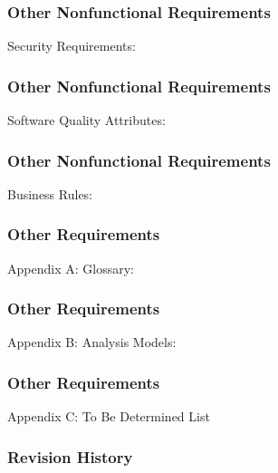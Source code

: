 \documentclass[utf8x]{beamer}
\begin{document}
\begin{frame}[t]
\frametitle{\LARGE Other Nonfunctional Requirements} %
\Large Security Requirements:
\end{frame}

\begin{frame}[t]
\frametitle{\LARGE Other Nonfunctional Requirements} %
\Large Software Quality Attributes:
\end{frame}

\begin{frame}[t]
\frametitle{\LARGE Other Nonfunctional Requirements} %
\Large Business Rules:
\end{frame}
\begin{frame}[t]
\frametitle{\huge Other Requirements} %
\Large Appendix A: Glossary:
\end{frame}

\begin{frame}[t]
\frametitle{\huge Other Requirements} %
\Large Appendix B: Analysis Models:
\end{frame}

\begin{frame}[t]
\frametitle{\huge Other Requirements} %
\Large Appendix C: To Be Determined List
\end{frame}
\begin{frame}[t]
\frametitle{\huge Revision History} %
\end{frame}
\end{document}
